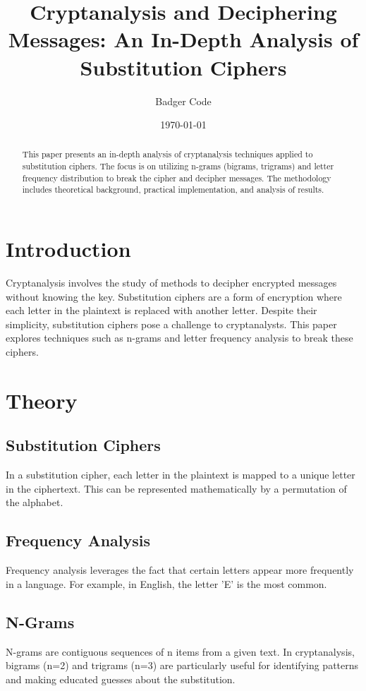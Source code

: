 \documentclass[12pt]{article}
\title{Cryptanalysis and Deciphering Messages: An In-Depth Analysis of Substitution Ciphers}
\author{Badger Code}
\date{\today}
\begin{document}
\maketitle

\begin{abstract}
This paper presents an in-depth analysis of cryptanalysis techniques applied to substitution ciphers. The focus is on utilizing n-grams (bigrams, trigrams) and letter frequency distribution to break the cipher and decipher messages. The methodology includes theoretical background, practical implementation, and analysis of results.
\end{abstract}

\section{Introduction}
Cryptanalysis involves the study of methods to decipher encrypted messages without knowing the key. Substitution ciphers are a form of encryption where each letter in the plaintext is replaced with another letter. Despite their simplicity, substitution ciphers pose a challenge to cryptanalysts. This paper explores techniques such as n-grams and letter frequency analysis to break these ciphers.

\section{Theory}
\subsection{Substitution Ciphers}
In a substitution cipher, each letter in the plaintext is mapped to a unique letter in the ciphertext. This can be represented mathematically by a permutation of the alphabet.

\subsection{Frequency Analysis}
Frequency analysis leverages the fact that certain letters appear more frequently in a language. For example, in English, the letter 'E' is the most common.

\subsection{N-Grams}
N-grams are contiguous sequences of n items from a given text. In cryptanalysis, bigrams (n=2) and trigrams (n=3) are particularly useful for identifying patterns and making educated guesses about the substitution.
\end{document}
